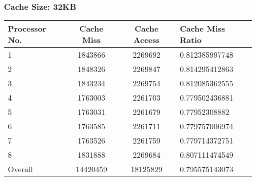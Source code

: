 \documentclass[]{article}
\begin{document}
\subsubsection{Cache Size: 32KB}
\begin{tabularx}{\textwidth}{ | l | c | c | X | }
\hline
Processor No.    & Cache Miss    & Cache Access  &   Cache Miss Ratio \\
\hline
1    & 1843866  & 2269692    & 0.812385997748 \\
\hline
2    & 1848326  & 2269847    & 0.814295412863 \\
\hline
3    & 1843234  & 2269754    & 0.812085362555 \\
\hline
4    & 1763003  & 2261703    & 0.779502436881 \\
\hline
5    & 1763031  & 2261679    & 0.77952308882 \\
\hline
6    & 1763585  & 2261711    & 0.779757006974 \\
\hline
7    & 1763526  & 2261759    & 0.779714372751 \\
\hline
8    & 1831888  & 2269684    & 0.807111474549 \\
\hline
Overall & 14420459    & 18125829  & 0.795575143073 \\
\hline
\end{tabularx}
\end{document}
